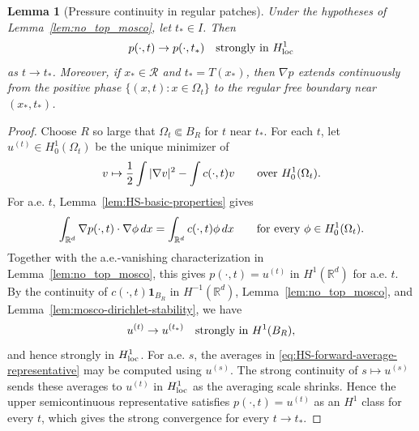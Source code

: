 \documentclass[11pt]{amsart}
\numberwithin{equation}{section}
\numberwithin{figure}{section}
\theoremstyle{plain}
\newtheorem{lem}[thm]{Lemma}
\theoremstyle{definition}
\theoremstyle{remark}
\theoremstyle{plain}
\def\R{\mathbb{R}}
\begin{document}
\begin{lem}[Pressure continuity in regular patches]\label{lem:pressure_C1_no_top}
Under the hypotheses of Lemma~\ref{lem:no_top_mosco}, let $t_*\in I$. Then
\[
    p(\cdot,t)\to p(\cdot,t_*)\quad\hbox{strongly in }H^1_{\rm loc}
\]
as $t\to t_*$. Moreover, if $x_*\in\mathcal R$ and $t_*=T(x_*)$, then $\nabla p$ extends continuously from the positive phase $\{(x,t):x\in\Omega_t\}$ to the regular free boundary near $(x_*,t_*)$.
\end{lem}
\begin{proof}
Choose \(R\) so large that \(\Omega_t\Subset B_R\) for \(t\) near \(t_*\).
For each \(t\), let \(u^{(t)}\in H^1_0(\Omega_t)\) be the unique minimizer of
\begin{equation}\label{eq:pressure_variational_energy}
    v\mapsto \frac12\int |\nabla v|^2-\int c(\cdot,t)v
    \qquad\hbox{over }H^1_0(\Omega_t).
\end{equation}
For a.e. \(t\), Lemma~\ref{lem:HS-basic-properties} gives
\[
    \int_{\R^d}\nabla p(\cdot,t)\cdot\nabla\phi\,dx
    =
    \int_{\R^d}c(\cdot,t)\phi\,dx
    \qquad\hbox{for every }\phi\in H^1_0(\Omega_t).
\]
Together with the a.e.-vanishing characterization in Lemma~\ref{lem:no_top_mosco}, this gives \(p(\cdot,t)=u^{(t)}\) in $H^1(\R^d)$ for a.e. $t$.
By the continuity of \(c(\cdot,t)\mathbf 1_{B_R}\) in $H^{-1}(\R^d)$, Lemma~\ref{lem:no_top_mosco}, and Lemma~\ref{lem:mosco-dirichlet-stability}, we have
\[
    u^{(t)}\to u^{(t_*)}\quad\hbox{strongly in }H^1(B_R),
\]
and hence strongly in $H^1_{\rm loc}$. For a.e. $s$, the averages in
\eqref{eq:HS-forward-average-representative} may be computed
using \(u^{(s)}\). The strong continuity of
\(s\mapsto u^{(s)}\) sends these averages to
\(u^{(t)}\) in $H^1_{\rm loc}$ as the averaging scale shrinks.
Hence the upper semicontinuous representative satisfies
\(p(\cdot,t)=u^{(t)}\) as an $H^1$ class for every $t$,
which gives the strong convergence for every \(t\to t_*\).


\end{proof}
\end{document}
